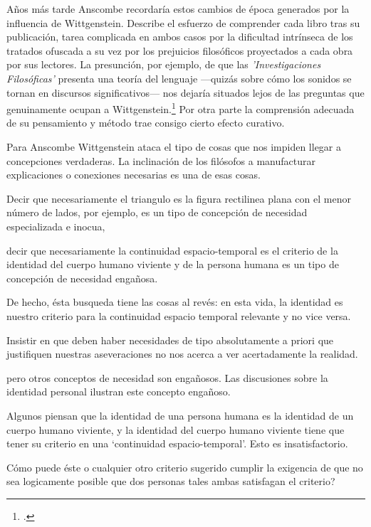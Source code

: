       Años más tarde Anscombe recordaría estos cambios de época generados por la
      influencia de Wittgenstein. Describe el esfuerzo de comprender cada libro tras
      su publicación, tarea complicada en ambos casos por la dificultad intrínseca
      de los tratados ofuscada a su vez por los prejuicios filosóficos proyectados a
      cada obra por sus lectores. La presunción, por ejemplo, de que las
      \emph{'Investigaciones Filosóficas'} presenta una teoría del lenguaje
      ---quizás sobre cómo los sonidos se tornan en discursos significativos--- nos
      dejaría situados lejos de las preguntas que genuinamente ocupan a
      Wittgenstein.\footcite[cf.~][p.~183]{twocuts} Por otra parte la comprensión
      adecuada de su pensamiento y método trae consigo cierto efecto curativo.

      Para Anscombe Wittgenstein ataca el tipo de cosas que nos impiden llegar a
      concepciones verdaderas. La inclinación de los filósofos a manufacturar
      explicaciones o conexiones necesarias es una de esas cosas. 


Decir que necesariamente 
el triangulo es la figura rectilinea plana con el menor número de lados,
por ejemplo, 
es un tipo de concepción de necesidad especializada e inocua,

decir que 
necesariamente 
la continuidad espacio-temporal es el criterio de la identidad del cuerpo humano viviente y de la persona humana
es un tipo de concepción de necesidad engañosa. 

De hecho, ésta busqueda tiene las cosas al revés: en esta vida, la identidad es nuestro criterio para la continuidad espacio temporal relevante y no vice versa. 

Insistir en que deben haber necesidades de tipo absolutamente a priori que justifiquen nuestras aseveraciones no nos acerca a ver acertadamente la realidad. 

      pero otros conceptos de necesidad son engañosos. Las discusiones sobre la
      identidad personal ilustran este concepto engañoso. 

      Algunos piensan que la identidad de una persona humana es la identidad de un
      cuerpo humano viviente, y la identidad del cuerpo humano viviente tiene que
      tener su criterio en una `continuidad espacio-temporal'. Esto es insatisfactorio. 

Cómo puede éste o cualquier otro criterio sugerido cumplir la exigencia de que no sea logicamente posible que dos personas tales ambas satisfagan el criterio?

